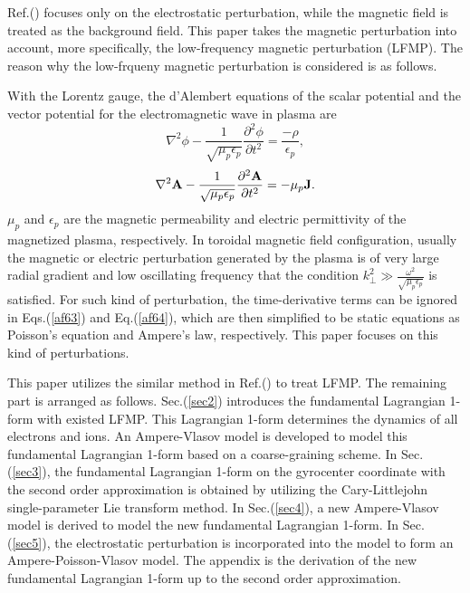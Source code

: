 \documentclass[12pt]{iopart}
\begin{document}
Ref.(\cite{2017shuangxi}) focuses only on the electrostatic perturbation, while the magnetic field is treated as the background field. This paper takes the magnetic perturbation into account, more specifically, the low-frequency magnetic perturbation (LFMP). The reason why the low-frqueny magnetic perturbation is considered is as follows.

With the Lorentz gauge, the d'Alembert equations of the scalar potential and the vector potential for the electromagnetic wave in plasma are
\begin{equation}\label{af63}
{\nabla ^2}\phi  - \frac{1}{{\sqrt {{\mu _p}{\epsilon_p}} }}\frac{{{\partial ^2}{\phi}}}{{\partial {t^2}}} = \frac{{ - \rho }}{{{\epsilon_p}}},
\end{equation}
\begin{equation}\label{af64}
{\nabla ^2}{\bf{A}} - \frac{1}{{\sqrt {{\mu _p}{\epsilon_p}} }}\frac{{{\partial ^2}{\bf{A}}}}{{\partial {t^2}}} =  - {\mu _p}{\bf{J}}.
\end{equation}
$\mu_p$ and $\epsilon_p$ are the magnetic permeability and electric permittivity of the magnetized plasma, respectively. In toroidal magnetic field configuration, usually the magnetic or electric perturbation generated by the plasma is of very large radial gradient and low oscillating frequency that the condition $k_ \bot ^2 \gg \frac{{{\omega ^2}}}{{\sqrt {{\mu _p}{\epsilon_p}} }}$ is satisfied. For such kind of perturbation, the time-derivative terms  can be ignored in Eqs.(\ref{af63}) and Eq.(\ref{af64}), which are then simplified to be static equations as Poisson's equation and Ampere's law, respectively.  This paper focuses on this kind of perturbations.

This paper utilizes the similar method in Ref.(\cite{2017shuangxi}) to treat LFMP. The remaining part is arranged as follows. Sec.(\ref{sec2}) introduces the fundamental Lagrangian 1-form with existed LFMP. This Lagrangian 1-form determines the dynamics of all electrons and ions. An Ampere-Vlasov model is developed to model this fundamental Lagrangian 1-form based on a coarse-graining scheme. In Sec.(\ref{sec3}), the fundamental Lagrangian 1-form on the gyrocenter coordinate with the second order approximation is obtained by utilizing the Cary-Littlejohn single-parameter Lie transform method\cite{1983cary}. In Sec.(\ref{sec4}), a new Ampere-Vlasov model is derived to model the new fundamental Lagrangian 1-form.
In Sec.(\ref{sec5}), the electrostatic perturbation is incorporated into the model to form an Ampere-Poisson-Vlasov model. The appendix is the derivation of the new fundamental Lagrangian 1-form up to the second order approximation.
\end{document}
